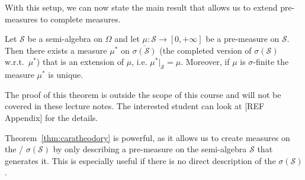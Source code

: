 With this setup, we can now state the main result that allows us to extend pre-measures to complete measures.

\begin{theorem}\label{thm:caratheodory}
Let $\mathcal{S}$ be a semi-algebra on $\Omega$ and let $\mu : \mathcal{S} \to [0,+\infty]$ be a pre-measure on $\mathcal{S}$. Then there exists a measure $\mu^\ast$ on $\overline{\sigma(\mathcal{S})}$ (the completed version of $\sigma(\mathcal{S})$ w.r.t.\ $\mu^\ast$) that is an extension of $\mu$, i.e. $\mu^\ast|_\mathcal{S} = \mu$. Moreover, if $\mu$ is $\sigma$-finite the measure $\mu^\ast$ is unique.
\end{theorem}

The proof of this theorem is outside the scope of this course and will not be covered in these lecture notes. The interested student can look at [REF Appendix] for the details.

Theorem~\ref{thm:caratheodory} is powerful, as it allows us to create measures on the \sigalg/ $\sigma(\mathcal{S})$ by only describing a pre-measure on the semi-algebra $\mathcal{S}$ that generates it. This is especially useful if there is no direct description of the $\sigma(\mathcal{S})$. 

%
%
%

